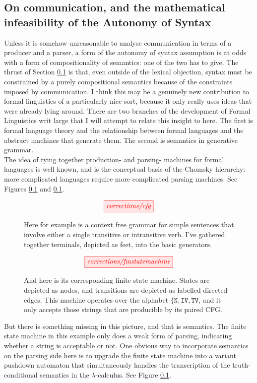 \subsection{On communication, and the mathematical infeasibility of the Autonomy of Syntax}

Unless it is somehow unreasonable to analyse communication in terms of a producer and a parser, a form of the autonomy of syntax assumption is at odds with a form of compositionality of semantics: one of the two has to give. The thrust of Section \ref{} is that, even outside of the lexical objection, syntax must be constrained by a purely compositional semantics because of the constraints imposed by communication. I think this may be a genuinely new contribution to formal linguistics of a particularly nice sort, because it only really uses ideas that were already lying around. There are two branches of the development of Formal Linguistics writ large that I will attempt to relate this insight to here. The first is formal language theory and the relationship between formal languages and the abstract machines that generate them. The second is semantics in generative grammar.\\

The idea of tying together production- and parsing- machines for formal languages is well known, and is the conceptual basis of the Chomsky hierarchy: more complicated languages require more complicated parsing machines. See Figures \ref{} and \ref{}.

\begin{figure}
\centering
\[\tikzfig{corrections/cfg}\]
\caption{Here for example is a context free grammar for simple sentences that involve either a single transitive or intransitive verb. I've gathered together terminals, depicted as feet, into the basic generators.}
\end{figure}

\begin{figure}
\centering
\[\tikzfig{corrections/finstatemachine}\]
\caption{And here is its corresponding finite state machine. States are depicted as nodes, and transitions are depicted as labelled directed edges. This machine operates over the alphabet $\{ \texttt{N}, \texttt{IV}, \texttt{TV}$, and it only accepts those strings that are producible by its paired CFG.}
\end{figure}

But there is something missing in this picture, and that is semantics. The finite state machine in this example only does a weak form of parsing, indicating whether a string is acceptable or not. One obvious way to incorporate semantics on the parsing side here is to upgrade the finite state machine into a variant pushdown automaton that simultaneously handles the transcription of the truth-conditional semantics in the $\lambda$-calculus. See Figure \ref{}.

